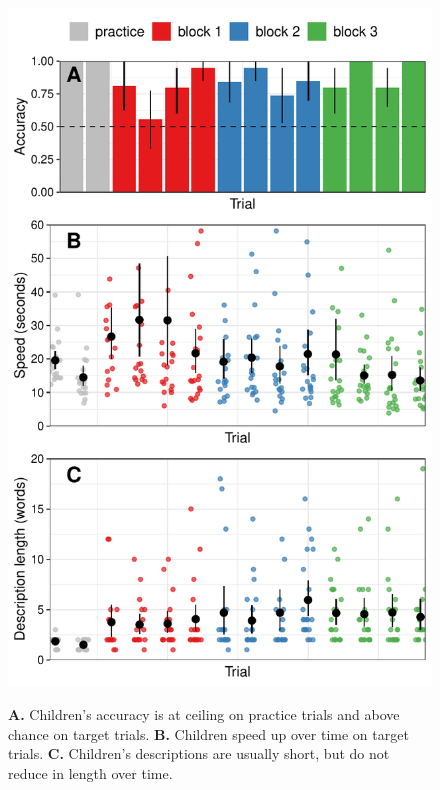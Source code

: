 \documentclass[11pt,a4paper]{article}
\begin{document}
	\begin{figure}
		\begin{minipage}{.5\textwidth}
			{	\includegraphics[width=\textwidth]{plot1.pdf}} 
			\begin{small}
			\textbf{	A.} Children's accuracy is at ceiling on practice trials and above chance on target trials.\textbf{ B.} Children speed up over time on target trials. \textbf{C.} Children's descriptions are usually short, but do not reduce in length over time. 
				
			\end{small}
			

\end{minipage}
\end{figure}
\end{document}
